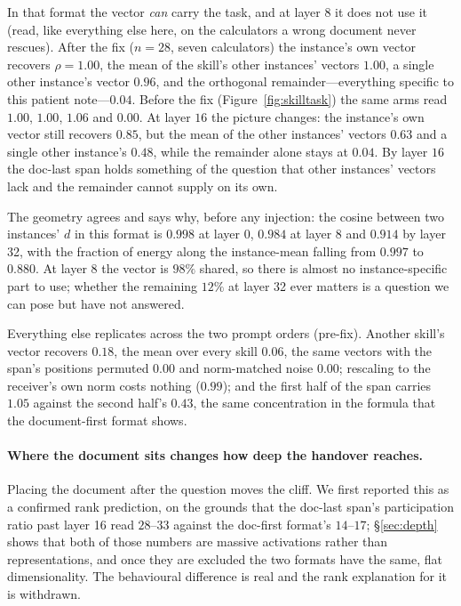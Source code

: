\documentclass{article}
\newcommand{\dvec}{\ensuremath{d}}
\begin{document}
In that format the vector \emph{can} carry the task, and at layer 8 it does not
use it (read, like everything else here, on the calculators a wrong document
never rescues). After the fix ($n=28$, seven calculators) the instance's own
vector recovers $\rho = 1.00$, the mean of the skill's other instances' vectors
$1.00$, a single other instance's vector $0.96$, and the
orthogonal remainder---everything specific to this patient note---$0.04$. Before
the fix (Figure~\ref{fig:skilltask}) the same arms read $1.00$, $1.00$, $1.06$
and $0.00$. At layer $16$ the picture changes: the instance's own vector still
recovers $0.85$, but the mean of the other instances' vectors $0.63$ and a
single other instance's $0.48$, while the remainder alone stays at $0.04$. By
layer $16$ the doc-last span holds something of the question that other
instances' vectors lack and the remainder cannot supply on its own.

The geometry agrees and says why, before any injection: the cosine between two
instances' $\dvec$ in this format is $0.998$ at layer 0, $0.984$ at layer 8 and
$0.914$ by layer 32, with the fraction of energy along the instance-mean falling
from $0.997$ to $0.880$. At layer 8 the vector is $98\%$ shared, so there is
almost no instance-specific part to use; whether the remaining $12\%$ at layer 32
ever matters is a question we can pose but have not answered.

Everything else replicates across the two prompt orders (pre-fix). Another skill's vector
recovers $0.18$, the mean over every skill $0.06$, the same vectors with the
span's positions permuted $0.00$ and norm-matched noise $0.00$; rescaling to the
receiver's own norm costs nothing ($0.99$); and the first half of the span
carries $1.05$ against the second half's $0.43$, the same concentration in the
formula that the document-first format shows.



\paragraph{Where the document sits changes how deep the handover reaches.}\label{sec:whose:docklast}
Placing the document after the question moves the cliff. We first reported this
as a confirmed rank prediction, on the grounds that the doc-last span's
participation ratio past layer 16 read $28$--$33$ against the doc-first format's
$14$--$17$; \S\ref{sec:depth} shows that both of those numbers are massive
activations rather than representations, and once they are excluded the two
formats have the same, flat dimensionality. The behavioural difference is real
and the rank explanation for it is withdrawn.
\end{document}
